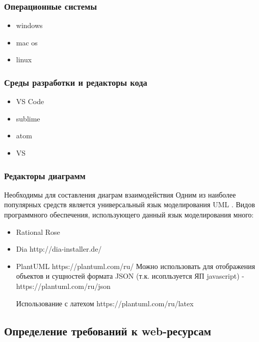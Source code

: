     \subsubsection{Операционные системы}
        \begin{itemize}
            \item windows
            \item mac os
            \item linux
        \end{itemize}
        
    \subsubsection{Среды разработки и редакторы кода}
        \begin{itemize}
            \item VS Code
            \item sublime
            \item atom
            \item VS
        \end{itemize}
    
    \subsubsection{Редакторы диаграмм}
        Необходимы для составления диаграм взаимодействия
        Одним из наиболее популярных средств является универсальный язык моделирования UML \cite{wiki-UML}.
        Видов программного обеспечения, использующего данный язык моделирования много:
        \begin{itemize}
            \item Rational Rose
            \item Dia   http://dia-installer.de/
            \item PlantUML  https://plantuml.com/ru/
            Можно использовать для отображения объектов и сущностей формата JSON (т.к. исопльзуется ЯП javascript) - https://plantuml.com/ru/json

            Использование с латехом
            https://plantuml.com/ru/latex

        \end{itemize}

\subsection{Определение требований к web-ресурсам}
    
